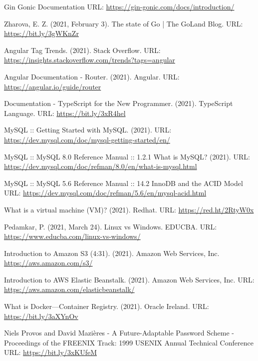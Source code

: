 \begin{thebibliography}{00}
 Gin Gonic Documentation
\newline
URL: \url{https://gin-gonic.com/docs/introduction/}

 Zharova, E. Z. (2021, February 3). The state of Go | The GoLand Blog.
\newline
URL: \url{https://bit.ly/3gWKnZr}

 Angular Tag Trends. (2021). Stack Overflow.
\newline
URL: \url{https://insights.stackoverflow.com/trends?tags=angular}

 Angular Documentation - Router. (2021). Angular. 
\newline
URL: \url{https://angular.io/guide/router}

 Documentation - TypeScript for the New Programmer. (2021). TypeScript Language.
\newline
URL: \url{https://bit.ly/3xR4hel}

 MySQL :: Getting Started with MySQL. (2021).
\newline
URL: \url{https://dev.mysql.com/doc/mysql-getting-started/en/}

 MySQL :: MySQL 8.0 Reference Manual :: 1.2.1 What is MySQL? (2021).
\newline
URL: \url{https://dev.mysql.com/doc/refman/8.0/en/what-is-mysql.html}

 MySQL :: MySQL 5.6 Reference Manual :: 14.2 InnoDB and the ACID Model
\newline
URL: \url{https://dev.mysql.com/doc/refman/5.6/en/mysql-acid.html}

 What is a virtual machine (VM)? (2021). Redhat.
\newline
URL: \url{https://red.ht/2RtyW0x}

 Pedamkar, P. (2021, March 24). Linux vs Windows. EDUCBA.
\newline
URL: \url{https://www.educba.com/linux-vs-windows/}

 Introduction to Amazon S3 (4:31). (2021). Amazon Web Services, Inc.
\newline
\url{https://aws.amazon.com/s3/}

 Introduction to AWS Elastic Beanstalk. (2021). Amazon Web Services, Inc. 
\newline 
URL: \url{https://aws.amazon.com/elasticbeanstalk/}

 What is Docker—Container Registry. (2021). Oracle Ireland.
\newline
URL: \url{https://bit.ly/3aXYnOv}

 Niels Provos and David Mazières - A Future-Adaptable Password Scheme - Proceedings of the FREENIX Track: 1999 USENIX Annual Technical Conference
\newline
URL: \url{https://bit.ly/3xKUfeM}

\end{thebibliography}